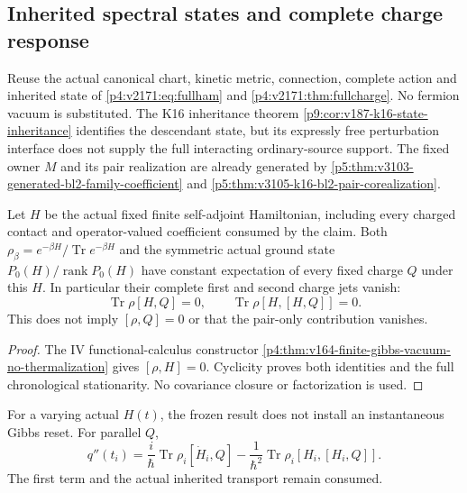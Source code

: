 \documentclass[12pt,a4paper]{article}
\begin{document}


\subsection{Inherited spectral states and complete charge response}
\label{p5c:v2188:sec:inheritedcharge}
Reuse the actual canonical chart, kinetic metric, connection, complete action
and inherited state of \ref{p4:v2171:eq:fullham} and
\ref{p4:v2171:thm:fullcharge}. No fermion vacuum is substituted.
The K16 inheritance theorem \ref{p9:cor:v187-k16-state-inheritance}
identifies the descendant state, but its expressly free perturbation
interface does not supply the full interacting ordinary-source support.
The fixed owner \(M\) and its pair realization are already generated by
\ref{p5:thm:v3103-generated-bl2-family-coefficient} and
\ref{p5:thm:v3105-k16-bl2-pair-corealization}.

\begin{theorem}
\label{p5c:v2188:thm:completegibbsjet}
Let \(H\) be the actual fixed finite self-adjoint Hamiltonian, including
every charged contact and operator-valued coefficient consumed by the
claim. Both \(\rho_\beta=e^{-\beta H}/\operatorname{Tr}e^{-\beta H}\) and
the symmetric actual ground state \(P_0(H)/\operatorname{rank}P_0(H)\)
have constant expectation of every fixed charge \(Q\) under this \(H\).
In particular their complete first and second charge jets vanish:
\[
 \operatorname{Tr}\rho[H,Q]=0,\qquad
 \operatorname{Tr}\rho[H,[H,Q]]=0 .
\]
This does not imply \([\rho,Q]=0\) or that the pair-only contribution
vanishes.
\end{theorem}
\begin{proof}
The IV functional-calculus constructor
\ref{p4:thm:v164-finite-gibbs-vacuum-no-thermalization} gives
\([\rho,H]=0\). Cyclicity proves both identities and the full chronological
stationarity. No covariance closure or factorization is used.
\end{proof}
For a varying actual \(H(t)\), the frozen result does not install an
instantaneous Gibbs reset. For parallel \(Q\),
\[
 q''(t_i)=\frac{i}{\hbar}\operatorname{Tr}\rho_i[\dot H_i,Q]
       -\frac1{\hbar^2}\operatorname{Tr}\rho_i[H_i,[H_i,Q]] .
\]
The first term and the actual inherited transport remain consumed.
\end{document}
